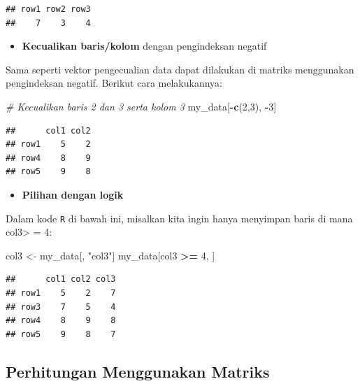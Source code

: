 \documentclass[]{book}
\newenvironment{Shaded}{\begin{snugshade}}{\end{snugshade}}
\newcommand{\KeywordTok}[1]{\textcolor[rgb]{0.13,0.29,0.53}{\textbf{#1}}}
\newcommand{\DecValTok}[1]{\textcolor[rgb]{0.00,0.00,0.81}{#1}}
\newcommand{\StringTok}[1]{\textcolor[rgb]{0.31,0.60,0.02}{#1}}
\newcommand{\CommentTok}[1]{\textcolor[rgb]{0.56,0.35,0.01}{\textit{#1}}}
\newcommand{\OperatorTok}[1]{\textcolor[rgb]{0.81,0.36,0.00}{\textbf{#1}}}
\newcommand{\NormalTok}[1]{#1}
\providecommand{\tightlist}{%
  \setlength{\itemsep}{0pt}\setlength{\parskip}{0pt}}
\begin{document}
\begin{verbatim}
## row1 row2 row3 
##    7    3    4
\end{verbatim}

\begin{itemize}
\tightlist
\item
  \textbf{Kecualikan baris/kolom} dengan pengindeksan negatif
\end{itemize}

Sama seperti vektor pengecualian data dapat dilakukan di matriks
menggunakan pengindeksan negatif. Berikut cara melakukannya:

\begin{Shaded}
\begin{Highlighting}[]
\CommentTok{# Kecualikan baris 2 dan 3 serta kolom 3}
\NormalTok{my_data[}\OperatorTok{-}\KeywordTok{c}\NormalTok{(}\DecValTok{2}\NormalTok{,}\DecValTok{3}\NormalTok{), }\OperatorTok{-}\DecValTok{3}\NormalTok{]}
\end{Highlighting}
\end{Shaded}

\begin{verbatim}
##      col1 col2
## row1    5    2
## row4    8    9
## row5    9    8
\end{verbatim}

\begin{itemize}
\tightlist
\item
  \textbf{Pilihan dengan logik}
\end{itemize}

Dalam kode \texttt{R} di bawah ini, misalkan kita ingin hanya menyimpan
baris di mana col3\textgreater{} = 4:

\begin{Shaded}
\begin{Highlighting}[]
\NormalTok{col3 <-}\StringTok{ }\NormalTok{my_data[, }\StringTok{"col3"}\NormalTok{]}
\NormalTok{my_data[col3 }\OperatorTok{>=}\StringTok{ }\DecValTok{4}\NormalTok{, ]}
\end{Highlighting}
\end{Shaded}

\begin{verbatim}
##      col1 col2 col3
## row1    5    2    7
## row3    7    5    4
## row4    8    9    8
## row5    9    8    7
\end{verbatim}

\subsection{Perhitungan Menggunakan
Matriks}\label{perhitungan-menggunakan-matriks}
\end{document}
